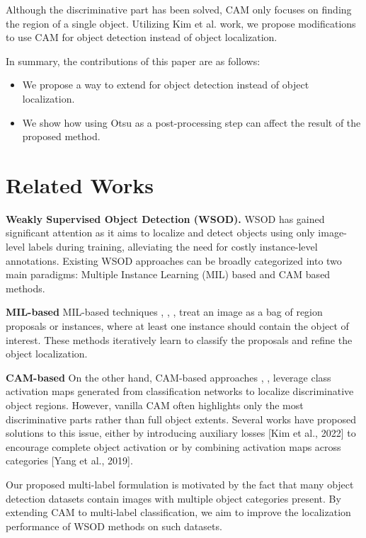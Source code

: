 \documentclass[conference]{IEEEtran}
\begin{document}
Although the discriminative part has been solved, CAM only focuses on finding the region of a single object. Utilizing Kim et al. \cite{kim2022bridging} work, we propose modifications to use CAM for object detection instead of object localization.

In summary, the contributions of this paper are as follows:
\begin{itemize}
    \item We propose a way to extend \cite{kim2022bridging} for object detection instead of object localization.
    \item We show how using Otsu as a post-processing step can affect the result of the proposed method.
\end{itemize}

\section{Related Works}
\textbf{Weakly Supervised Object Detection (WSOD).} WSOD has gained significant attention as it aims to localize and detect objects using only image-level labels during training, alleviating the need for costly instance-level annotations. Existing WSOD approaches can be broadly categorized into two main paradigms: Multiple Instance Learning (MIL) based and CAM based methods.

\textbf{MIL-based}
MIL-based techniques \cite{DBLP:journals/corr/BilenV15}, \cite{tang2017multiple}, \cite{wang2022d2df2wod}, \cite{huang2022w2nswitching} treat an image as a bag of region proposals or instances, where at least one instance should contain the object of interest. These methods iteratively learn to classify the proposals and refine the object localization.

\textbf{CAM-based}
On the other hand, CAM-based approaches \cite{zhou2015cnnlocalization}, \cite{kim2022bridging}, \cite{yang2019combinational} leverage class activation maps generated from classification networks to localize discriminative object regions. However, vanilla CAM often highlights only the most discriminative parts rather than full object extents. Several works have proposed solutions to this issue, either by introducing auxiliary losses [Kim et al., 2022] to encourage complete object activation or by combining activation maps across categories [Yang et al., 2019].

Our proposed multi-label formulation is motivated by the fact that many object detection datasets contain images with multiple object categories present. By extending CAM to multi-label classification, we aim to improve the localization performance of WSOD methods on such datasets.
\end{document}
